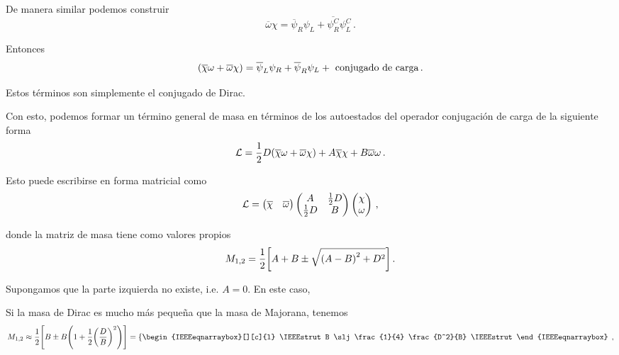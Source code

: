 De manera similar podemos construir
%
\begin{equation}
	\overline{\omega} \chi = \overline{\psi}_R \psi_L + \overline{\psi^C_R} \psi^C_L \,.
\end{equation}

Entonces
%
\begin{equation}
	\qty(\overline{\chi}\omega + \overline{\omega}\chi) = \overline{\psi}_L \psi_R + \overline{\psi}_R \psi_L + \text{ conjugado de carga} \,.
\end{equation}

Estos términos son simplemente el conjugado de Dirac.

Con esto, podemos formar un término general de masa en términos de los autoestados del operador conjugación de carga de la siguiente forma
%
\begin{equation}
	\mathcal{L} = \frac{1}{2} D \qty(\overline{\chi}\omega + \overline{\omega}\chi) + A\overline{\chi}\chi + B \overline{\omega}\omega \,.
\end{equation}

Esto puede escribirse en forma matricial como
%
\begin{equation}
	\lagdn = \pmqty{\overline{\chi} & \overline{\omega}} \pmqty{A & \frac{1}{2}D \\ \frac{1}{2}D & B} \pmqty{\chi \\ \omega} \,,
\end{equation}

\noindent donde la matriz de masa tiene como valores propios
%
\begin{equation}
	M_{1,2} = \frac{1}{2} \qty[A + B \pm \sqrt{\qty(A - B)^2 + D^2}] \,.
\end{equation}

Supongamos que la parte izquierda no existe, i.e. $A=0$. En este caso,
%

Si la masa de Dirac es mucho más pequeña que la masa de Majorana, tenemos
%
\begin{equation}
	M_{1,2} \approx \frac{1}{2} \qty[B \pm B \qty(1 + \frac{1}{2} \qty(\frac{D}{B})^2)] = \left\{ \begin{IEEEeqnarraybox}[][c]{l}
		\IEEEstrut
		B \slj 
		\frac{1}{4} \frac{D^2}{B}
		\IEEEstrut
	\end{IEEEeqnarraybox} \right. \,,
\end{equation}

